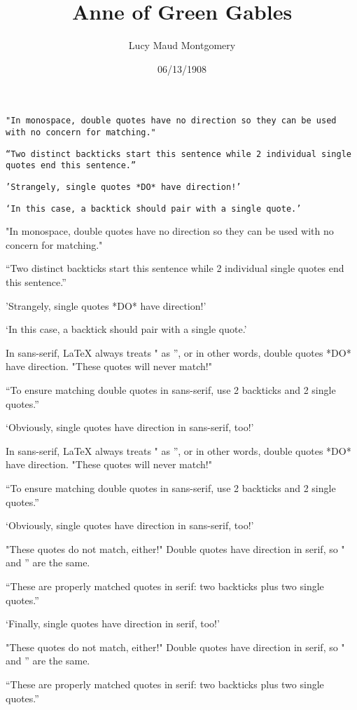 \documentclass[a4paper]{article}
\title{Anne of Green Gables}
\author{Lucy Maud Montgomery}
\date{06/13/1908}
\begin{document}
\maketitle

\texttt{"In monospace, double quotes have no direction so they can be used with no concern for matching."}

\texttt{``Two distinct backticks start this sentence while 2 individual single quotes end this sentence.''}

\texttt{'Strangely, single quotes *DO* have direction!'}

\texttt{`In this case, a backtick should pair with a single quote.'}

\ttfamily "In monospace, double quotes have no direction so they can be used with no concern for matching."

``Two distinct backticks start this sentence while 2 individual single quotes end this sentence.''

'Strangely, single quotes *DO* have direction!'

`In this case, a backtick should pair with a single quote.'

\textsf{In sans-serif, LaTeX always treats " as '', or in other words, double quotes *DO* have direction. "These quotes will never match!"}

\textsf{``To ensure matching double quotes in sans-serif, use 2 backticks  and 2 single quotes.''}

\textsf{`Obviously, single quotes have direction in sans-serif, too!'}

\sffamily In sans-serif, LaTeX always treats " as '', or in other words, double quotes *DO* have direction. "These quotes will never match!"

``To ensure matching double quotes in sans-serif, use 2 backticks  and 2 single quotes.''

`Obviously, single quotes have direction in sans-serif, too!'

\textrm{"These quotes do not match, either!" Double quotes have direction in serif, so " and '' are the same.}

\textrm{``These are properly matched quotes in serif: two backticks plus two single quotes.''}

\textrm{`Finally, single quotes have direction in serif, too!'}

\rmfamily "These quotes do not match, either!" Double quotes have direction in serif, so " and '' are the same.

``These are properly matched quotes in serif: two backticks plus two single quotes.''
\end{document}
